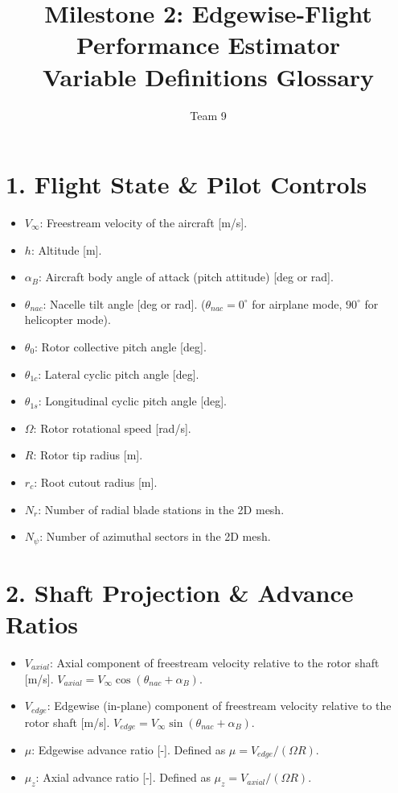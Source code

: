 \documentclass{article}
\title{Milestone 2: Edgewise-Flight Performance Estimator \\ \Large Variable Definitions Glossary}
\author{Team 9}
\date{}
\begin{document}
\maketitle

\section*{1. Flight State \& Pilot Controls}
\begin{itemize}
    \item $V_{\infty}$: Freestream velocity of the aircraft [m/s].
    \item $h$: Altitude [m].
    \item $\alpha_B$: Aircraft body angle of attack (pitch attitude) [deg or rad].
    \item $\theta_{nac}$: Nacelle tilt angle [deg or rad]. ($\theta_{nac} = 0^\circ$ for airplane mode, $90^\circ$ for helicopter mode).
    \item $\theta_0$: Rotor collective pitch angle [deg].
    \item $\theta_{1c}$: Lateral cyclic pitch angle [deg].
    \item $\theta_{1s}$: Longitudinal cyclic pitch angle [deg].
    \item $\Omega$: Rotor rotational speed [rad/s].
    \item $R$: Rotor tip radius [m].
    \item $r_c$: Root cutout radius [m].
    \item $N_r$: Number of radial blade stations in the 2D mesh.
    \item $N_\psi$: Number of azimuthal sectors in the 2D mesh.
\end{itemize}

\section*{2. Shaft Projection \& Advance Ratios}
\begin{itemize}
    \item $V_{axial}$: Axial component of freestream velocity relative to the rotor shaft [m/s]. $V_{axial} = V_\infty \cos(\theta_{nac} + \alpha_B)$.
    \item $V_{edge}$: Edgewise (in-plane) component of freestream velocity relative to the rotor shaft [m/s]. $V_{edge} = V_\infty \sin(\theta_{nac} + \alpha_B)$.
    \item $\mu$: Edgewise advance ratio [-]. Defined as $\mu = V_{edge} / (\Omega R)$.
    \item $\mu_z$: Axial advance ratio [-]. Defined as $\mu_z = V_{axial} / (\Omega R)$.
\end{itemize}
\end{document}
